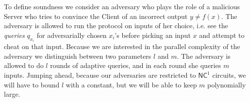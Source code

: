 \def\accSet{{\cal I}}

\newcommand{\BatchVCPG}{\function{BatchProbGen}}

\renewcommand{\vec}[1]{\mathbf{#1}}

To define soundness we consider an adversary who plays the role of a malicious Server who tries to convince the Client of an incorrect output $y \neq f(x)$. The adversary is allowed to run the protocol on inputs of her choice, i.e. see the {\em queries} $q_{x_i}$ for adversarially chosen $x_{i}$'s before picking an 
input $x$ and attempt to cheat on that input. 
Because we are interested in the parallel complexity of the adversary we distinguish between two parameters $l$ and $m$. The adversary is allowed to do $l$ rounds of adaptive queries, and in each round she queries $m$ inputs. Jumping ahead, because our adversaries are restricted to $\mathsf{NC}^1$ circuits, we will have to bound $l$ with a constant, but we will be able to keep $m$ polynomially large. 





